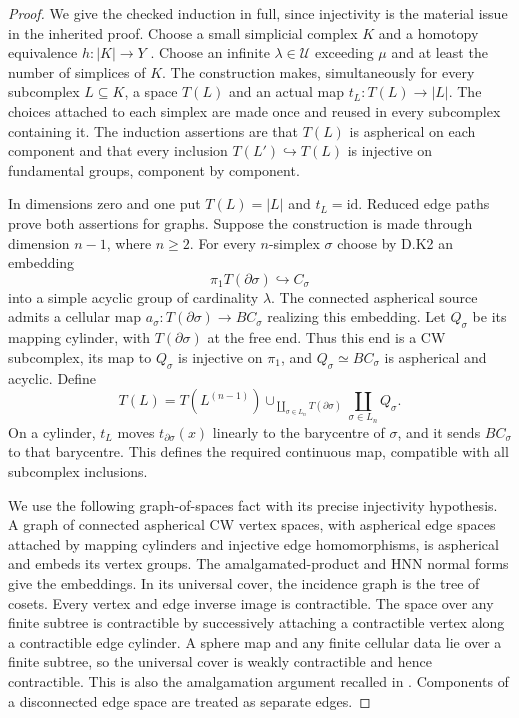 \begin{proof}
We give the checked induction in full, since injectivity is the
material issue in the inherited proof. Choose a small simplicial
complex $K$ and a homotopy equivalence $h:|K|\to Y$
\citep[Theorem~2C.5]{AHatcher2002}. Choose an infinite
$\lambda\in\mathcal U$ exceeding $\mu$ and at least the number
of simplices of $K$. The construction makes, simultaneously for
every subcomplex $L\subseteq K$, a space $T(L)$ and an actual
map $t_L:T(L)\to|L|$. The choices attached to each simplex are
made once and reused in every subcomplex containing it. The
induction assertions are that $T(L)$ is aspherical on each
component and that every inclusion $T(L')\hookrightarrow T(L)$
is injective on fundamental groups, component by component.

In dimensions zero and one put $T(L)=|L|$ and $t_L=\mathrm{id}$.
Reduced edge paths prove both assertions for graphs. Suppose
the construction is made through dimension $n-1$, where
$n\geq2$. For every $n$-simplex $\sigma$ choose by D.K2 an
embedding
\[
 \pi_1T(\partial\sigma)\hookrightarrow C_\sigma
\]
into a simple acyclic group of cardinality $\lambda$.
The connected aspherical source admits a cellular map
$a_\sigma:T(\partial\sigma)\to BC_\sigma$ realizing this
embedding. Let $Q_\sigma$ be its mapping cylinder, with
$T(\partial\sigma)$ at the free end. Thus this end is a CW
subcomplex, its map to $Q_\sigma$ is injective on $\pi_1$,
and $Q_\sigma\simeq BC_\sigma$ is aspherical and acyclic.
Define
\[
 T(L)=T(L^{(n-1)})\cup_{\coprod_{\sigma\in L_n}
                   T(\partial\sigma)}
                   \coprod_{\sigma\in L_n}Q_\sigma.
 \tag{D.K3.1}
\]
On a cylinder, $t_L$ moves $t_{\partial\sigma}(x)$ linearly
to the barycentre of $\sigma$, and it sends $BC_\sigma$ to
that barycentre. This defines the required continuous map,
compatible with all subcomplex inclusions.

We use the following graph-of-spaces fact with its precise
injectivity hypothesis. A graph of connected aspherical CW
vertex spaces, with aspherical edge spaces attached by mapping
cylinders and injective edge homomorphisms, is aspherical and
embeds its vertex groups. The amalgamated-product and HNN
normal forms give the embeddings. In its universal cover,
the incidence graph is the tree of cosets. Every vertex and
edge inverse image is contractible. The space over any finite
subtree is contractible by successively attaching a
contractible vertex along a contractible edge cylinder. A
sphere map and any finite cellular data lie over a finite
subtree, so the universal cover is weakly contractible and
hence contractible. This is also the amalgamation argument
recalled in \citet[Section~1, before Proposition~1.1]
{ABaumslagDyerHeller1980}. Components of a disconnected edge
space are treated as separate edges.


\end{proof}
